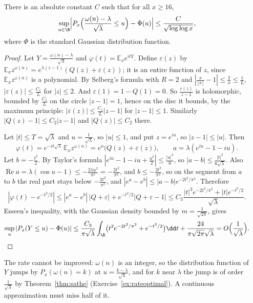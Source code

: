 \begin{theorem}\label{thm:renyituran}
There is an absolute constant $C$ such that for all $x\ge16$,
\[
\sup_{u\in\R}\Bigl|P_x\Bigl(\frac{\omega(n)-\lambda}{\sqrt\lambda}\le u\Bigr)-\Phi(u)\Bigr|\le\frac C{\sqrt{\log\log x}},
\]
where $\Phi$ is the standard Gaussian distribution function.
\end{theorem}
\begin{proof}
Let $Y=\frac{\omega(n)-\lambda}{\sqrt\lambda}$ and $\varphi(t)=\mathbb E_xe^{itY}$. Define $\varepsilon(z)$ by $\mathbb E_xz^{\omega(n)}=e^{\lambda(z-1)}(Q(z)+\varepsilon(z))$; it is an entire function of $z$, since $\mathbb E_xz^{\omega(n)}$ is a polynomial. By Selberg's formula with $R=2$ and $|\frac x{\lfloor x\rfloor}-1|\le\frac2x\le\frac1L$, $|\varepsilon(z)|\le\frac{C_1}L$ for $|z|\le2$. And $\varepsilon(1)=1-Q(1)=0$. So $\frac{\varepsilon(z)}{z-1}$ is holomorphic, bounded by $\frac{C_1}L$ on the circle $|z-1|=1$, hence on the disc it bounds, by the maximum principle: $|\varepsilon(z)|\le\frac{C_1}L|z-1|$ for $|z-1|\le1$. Similarly $|Q(z)-1|\le C_2|z-1|$ and $|Q(z)|\le C_2$ there.

Let $|t|\le T=\sqrt\lambda$ and $u=\frac t{\sqrt\lambda}$, so $|u|\le1$, and put $z=e^{iu}$, so $|z-1|\le|u|$. Then
\[
\varphi(t)=e^{-it\sqrt\lambda}\,\mathbb E_xz^{\omega(n)}=e^{a}\bigl(Q(z)+\varepsilon(z)\bigr),\qquad a=\lambda(e^{iu}-1-iu).
\]
Let $b=-\frac{t^2}2$. By Taylor's formula $|e^{iu}-1-iu+\frac{u^2}2|\le\frac{|u|^3}6$, so $|a-b|\le\frac{|t|^3}{6\sqrt\lambda}$. Also $\operatorname{Re}a=\lambda(\cos u-1)\le-\frac{2\lambda u^2}{\pi^2}=-\frac{2t^2}{\pi^2}$, and $b\le-\frac{2t^2}{\pi^2}$, so on the segment from $a$ to $b$ the real part stays below $-\frac{2t^2}{\pi^2}$, and $|e^a-e^b|\le|a-b|e^{-2t^2/\pi^2}$. Therefore
\[
|\varphi(t)-e^{-t^2/2}|\le|e^a-e^b|\,|Q+\varepsilon|+e^{-t^2/2}|Q+\varepsilon-1|\le C_3\frac{|t|^3e^{-2t^2/\pi^2}+|t|e^{-t^2/2}}{\sqrt\lambda}.
\]
Esseen's inequality, with the Gaussian density bounded by $m=\frac1{\sqrt{2\pi}}$, gives
\[
\sup_u|P_x(Y\le u)-\Phi(u)|\le\frac{C_3}{\pi\sqrt\lambda}\int_{\R}\bigl(t^2e^{-2t^2/\pi^2}+e^{-t^2/2}\bigr)\dd t+\frac{24}{\pi\sqrt{2\pi}\sqrt\lambda}=O\Bigl(\frac1{\sqrt\lambda}\Bigr).\qedhere
\]
\end{proof}

The rate cannot be improved: $\omega(n)$ is an integer, so the distribution function of $Y$ jumps by $P_x(\omega(n)=k)$ at $u=\frac{k-\lambda}{\sqrt\lambda}$, and for $k$ near $\lambda$ the jump is of order $\frac1{\sqrt\lambda}$ by Theorem~\ref{thm:sathe} (Exercise~\ref{ex:rateoptimal}). A continuous approximation must miss half of it.

